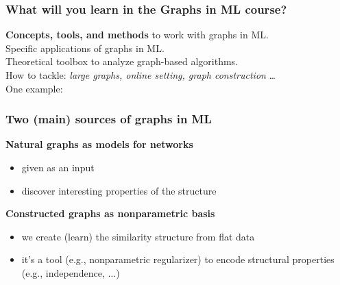 \documentclass{beamer}
\begin{document}
\newcommand{\topictitle}{Introduction to Graphs in ML}
\newcommand{\topicsubtitle}{Course Overview and Motivation}
\newcommand{\misoclasstinytitleslide}{Partially based on material by:  Andreas Krause, \\[-1em] Branislav Kveton, Michael Kearns}

\MakeTopicSlide

\begin{frame}
\frametitle{What will you learn in the Graphs in ML course?}

\textbf{Concepts\pause, tools\pause, and methods\pause} to work with graphs in ML.  \\[2em]

\pause Specific applications of graphs in ML. \\[2em]

\pause Theoretical toolbox to analyze graph-based algorithms.\\[2em]


\pause How to tackle: \emph{large graphs, online setting, graph construction} \dots  \\[2em]

\pause One example:  

\end{frame}

\begin{frame}
\frametitle{Two (main) sources of graphs in ML}

\textbf{Natural graphs as models for networks}
\begin{itemize}\addtolength{\itemsep}{.25\baselineskip}
\item<2-> {given as an input} 
\item<3-> discover interesting properties of the structure
\end{itemize}

\vspace{\baselineskip}
\textbf{Constructed graphs as nonparametric basis}
\begin{itemize}\addtolength{\itemsep}{0.25\baselineskip}
\item<4-> we create (learn) the similarity structure from flat data
\item<5-> it's a tool (e.g., nonparametric regularizer) to encode structural properties (e.g., independence, $\dots$)
\end{itemize}
\end{frame}


\MakeLastSlide
\end{document}
